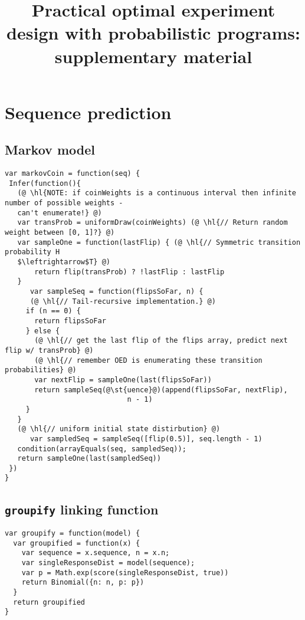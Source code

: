 \documentclass{article}
\title{Practical optimal experiment design with probabilistic programs: supplementary material}
\begin{document}

\maketitle

\section{Sequence prediction}

\subsection{Markov model}

\begin{lstlisting}[upquote=true]
var markovCoin = function(seq) {
 Infer(function(){
   (@ \hl{NOTE: if coinWeights is a continuous interval then infinite number of possible weights -
   can't enumerate!} @)
   var transProb = uniformDraw(coinWeights) (@ \hl{// Return random weight between [0, 1]?} @)
   var sampleOne = function(lastFlip) { (@ \hl{// Symmetric transition probability H
   $\leftrightarrow$T} @)
       return flip(transProb) ? !lastFlip : lastFlip
   }
	  var sampleSeq = function(flipsSoFar, n) {
      (@ \hl{// Tail-recursive implementation.} @)
     if (n == 0) {
       return flipsSoFar
     } else {
       (@ \hl{// get the last flip of the flips array, predict next flip w/ transProb} @)
       (@ \hl{// remember OED is enumerating these transition probabilities} @)
       var nextFlip = sampleOne(last(flipsSoFar))
       return sampleSeq(@\st{uence}@)(append(flipsSoFar, nextFlip),
                             n - 1)
     }
   }
   (@ \hl{// uniform initial state distirbution} @)
	  var sampledSeq = sampleSeq([flip(0.5)], seq.length - 1)
   condition(arrayEquals(seq, sampledSeq));
   return sampleOne(last(sampledSeq))
 })
}
\end{lstlisting}

\subsection{\texttt{groupify} linking function}

\begin{lstlisting}[upquote=true]
var groupify = function(model) {
  var groupified = function(x) {
    var sequence = x.sequence, n = x.n;
    var singleResponseDist = model(sequence);
    var p = Math.exp(score(singleResponseDist, true))
    return Binomial({n: n, p: p})
  }
  return groupified
}
\end{lstlisting}
\end{document}
